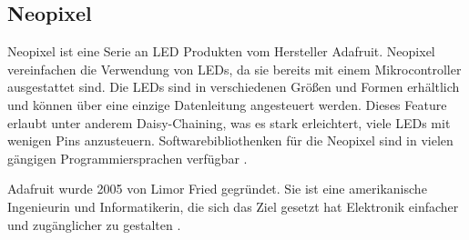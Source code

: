 \subsection{Neopixel}
\label{sec:neopixel}

Neopixel ist eine Serie an LED Produkten vom Hersteller Adafruit. Neopixel vereinfachen die Verwendung von LEDs, da sie bereits mit einem Mikrocontroller ausgestattet sind. Die LEDs sind in verschiedenen Größen und Formen erhältlich und können über eine einzige Datenleitung angesteuert werden. Dieses Feature erlaubt unter anderem \Gls{Daisy-Chaining}, was es stark erleichtert, viele LEDs mit wenigen \Glspl{Pin} anzusteuern. Softwarebibliothenken für die Neopixel sind in vielen gängigen Programmiersprachen verfügbar .

Adafruit wurde 2005 von Limor Fried gegründet. Sie ist eine amerikanische Ingenieurin und Informatikerin, die sich das Ziel gesetzt hat Elektronik einfacher und zugänglicher zu gestalten .
